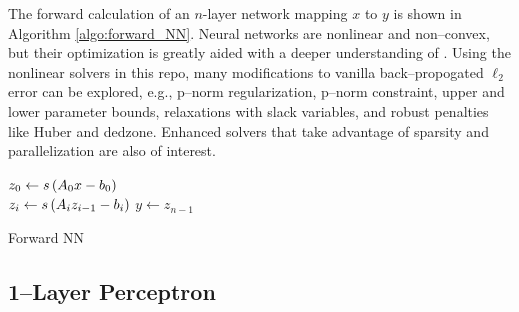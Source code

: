 \documentclass{article}
\begin{document}
    The forward calculation of an $n$-layer network mapping 
    $x$ to $y$ is shown in Algorithm \ref{algo:forward_NN}.
    Neural networks are nonlinear and non--convex, 
    but their optimization is greatly aided with a deeper understanding of \QP.
    Using the nonlinear \QP solvers in this repo, 
    many modifications to vanilla back--propogated $\ell_2$ error
    can be explored, e.g.,
    p--norm regularization,
    p--norm constraint,
    upper and lower parameter bounds, 
    relaxations with slack variables, and
    robust penalties like Huber and dedzone.  
    Enhanced solvers that take advantage of sparsity and parallelization
    are also of interest.

    \begin{algorithm}[H]
        \SetAlgoLined
        $z_0\leftarrow s \left(A_0x-b_0\right)$\\
        {
            $z_i\leftarrow s \left(A_iz_{i-1}-b_i\right)$
        }
        \Return $y\leftarrow z_{n-1}$
    \caption{Forward NN}
    \label{algo:forward_NN} 
    \end{algorithm}

\subsection{1--Layer Perceptron} 
\end{document}
